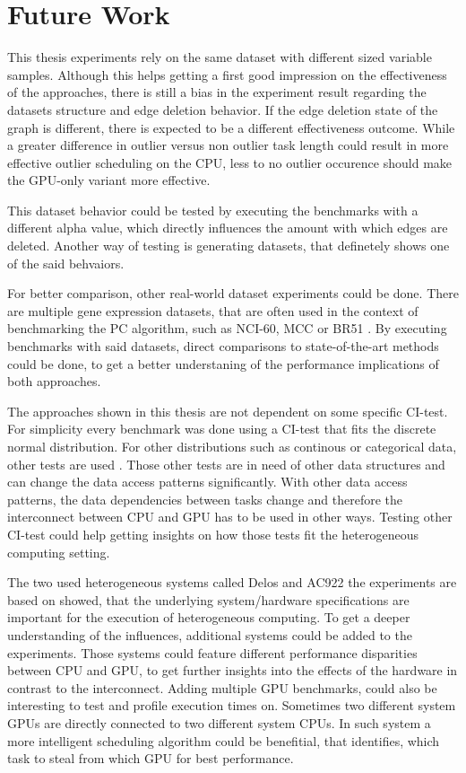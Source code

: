 \chapter{Future Work}
This thesis experiments rely on the same dataset with different sized variable samples. Although this helps getting a first good impression on the effectiveness of the approaches, there is still a bias in the experiment result regarding the datasets structure and edge deletion behavior. If the edge deletion state of the graph is different, there is expected to be a different effectiveness outcome. While a greater difference in outlier versus non outlier task length could result in more effective outlier scheduling on the CPU, less to no outlier occurence should make the GPU-only variant more effective.

This dataset behavior could be tested by executing the benchmarks with a different alpha value, which directly influences the amount with which edges are deleted. Another way of testing is generating datasets, that definetely shows one of the said behvaiors.

For better comparison, other real-world dataset experiments could be done. There are multiple gene  expression datasets, that are often used in the context of benchmarking the PC algorithm, such as NCI-60, MCC or BR51 \cite{leFastPCAlgorithm2019}. By executing benchmarks with said datasets, direct comparisons to state-of-the-art methods could be done, to get a better understaning of the performance implications of both approaches.

The approaches shown in this thesis are not dependent on some specific CI-test. For simplicity every benchmark was done using a CI-test that fits the discrete normal distribution. For other distributions such as continous or categorical data, other tests are used \cite{scutariLearningBayesianNetworks2010}. Those other tests are in need of other data structures and can change the data access patterns significantly. With other data access patterns, the data dependencies between tasks change and therefore the interconnect between CPU and GPU has to be used in other ways. Testing other CI-test could help getting insights on how those tests fit the heterogeneous computing setting.

The two used heterogeneous systems called Delos and AC922 the experiments are based on showed, that the underlying system/hardware specifications are important for the execution of heterogeneous computing. To get a deeper understanding of the influences, additional systems could be added to the experiments. Those systems could feature different performance disparities between CPU and GPU, to get further insights into the effects of the hardware in contrast to the interconnect. Adding multiple GPU benchmarks, could also be interesting to test and profile execution times on. Sometimes two different system GPUs are directly connected to two different system CPUs. In such system a more intelligent scheduling algorithm could be benefitial, that identifies, which task to steal from which GPU for best performance.

